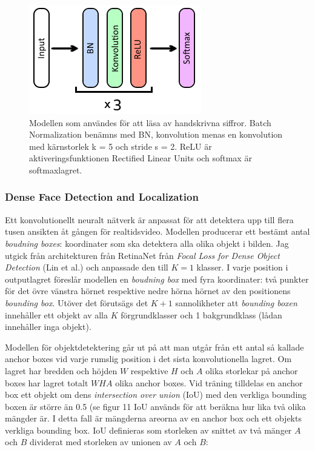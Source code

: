 \documentclass[a4paper,11pt,twoside]{article}
\begin{document}
\begin{figure}[h]\label{MNISTmodel}
	\centering
  		\includegraphics[scale=1.2]{MNISTmodel.png}
  	\caption{Modellen som användes för att läsa av handskrivna siffror. Batch Normalization benämns med BN, konvolution menas en konvolution med kärnstorlek k = 5 och stride s = 2. ReLU är aktiveringsfunktionen Rectified Linear Units och softmax är softmaxlagret.}
\end{figure}

\subsubsection{Dense Face Detection and Localization}
Ett konvolutionellt neuralt nätverk är anpassat för att detektera upp till flera tusen ansikten åt gången för realtidsvideo. Modellen producerar ett bestämt antal \textit{boudning boxes}: koordinater som ska detektera alla olika objekt i bilden. Jag utgick från architekturen från RetinaNet från \textit{Focal Loss for Dense Object Detection} (Lin et al.) och anpassade den till $K = 1$ klasser. I varje position i outputlagret föreslår modellen en \textit{boudning box} med fyra koordinater: två punkter för det övre vänstra hörnet respektive nedre hörna hörnet av den positionens \textit{bounding box}. Utöver det förutsägs det $K+1$ sannolikheter att \textit{bounding boxen} innehåller ett objekt av alla $K$ förgrundklasser och 1 bakgrundklass (lådan innehåller inga objekt).\cite{cs231n}\cite{retinanet}

Modellen för objektdetektering går ut på att man utgår från ett antal så kallade anchor boxes vid varje rumslig position i det sista konvolutionella lagret. Om lagret har bredden och höjden $W$ respektive $H$ och $A$ olika storlekar på anchor boxes har lagret totalt $WHA$ olika anchor boxes. Vid träning tilldelas en anchor box ett objekt om dens \textit{intersection over union} (IoU) med den verkliga bounding boxen är större än 0.5 (se figur 11 IoU används för att beräkna hur lika två olika mängder är. I detta fall är mängderna areorna av en anchor box och ett objekts verkliga bounding box. IoU definieras som storleken av snittet av två mänger $A$ och $B$ dividerat med storleken av unionen av $A$ och $B$: \cite{cs231n} \cite{iou}
\end{document}
